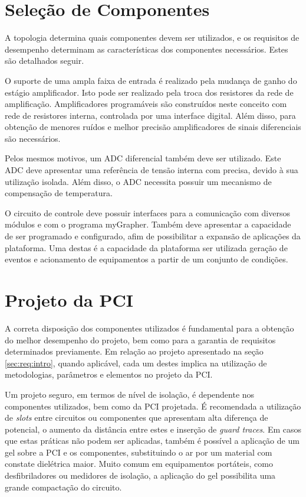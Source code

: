 		\section{Seleção de Componentes}\label{sec:req:hw:componentes}

			A topologia determina quais componentes devem ser utilizados, e os requisitos de desempenho determinam as características dos componentes necessários. Estes são detalhados seguir.

			O suporte de uma ampla faixa de entrada é realizado pela mudança de ganho do estágio amplificador. Isto pode ser realizado pela troca dos resistores da rede de amplificação. Amplificadores programáveis são construídos neste conceito com rede de resistores interna, controlada por uma interface digital. Além disso, para obtenção de menores ruídos e melhor precisão amplificadores de sinais diferenciais são necessários.

			Pelos mesmos motivos, um ADC diferencial também deve ser utilizado. Este ADC deve apresentar uma referência de tensão interna com precisa, devido à sua utilização isolada. Além disso, o ADC necessita possuir um mecanismo de compensação de temperatura.

			O circuito de controle deve possuir interfaces para a comunicação com diversos módulos e com o programa myGrapher. Também deve apresentar a capacidade de ser programado e configurado, afim de possibilitar a expansão de aplicações da plataforma. Uma destas é a capacidade da plataforma ser utilizada geração de eventos e acionamento de equipamentos a partir de um conjunto de condições.


		\section{Projeto da PCI}\label{sec:req:hw:layout}

			A correta disposição dos componentes utilizados é fundamental para a obtenção do melhor desempenho do projeto, bem como para a garantia de requisitos determinados previamente. Em relação ao projeto apresentado na seção \ref{sec:req:intro}, quando aplicável, cada um destes implica na utilização de metodologias, parâmetros e elementos no projeto da PCI.

			Um projeto seguro, em termos de nível de isolação, é dependente nos componentes utilizados, bem como da PCI projetada. É recomendada a utilização de \textit{slots} entre circuitos ou componentes que apresentam alta diferença de potencial, o aumento da distância entre estes e inserção de \textit{guard traces}. Em casos que estas práticas não podem ser aplicadas, também é possível a aplicação de um gel sobre a PCI e os componentes, substituindo o ar por um material com constate dielétrica maior. Muito comum em equipamentos portáteis, como desfibriladores ou medidores de isolação, a aplicação do gel possibilita uma grande compactação do circuito.

